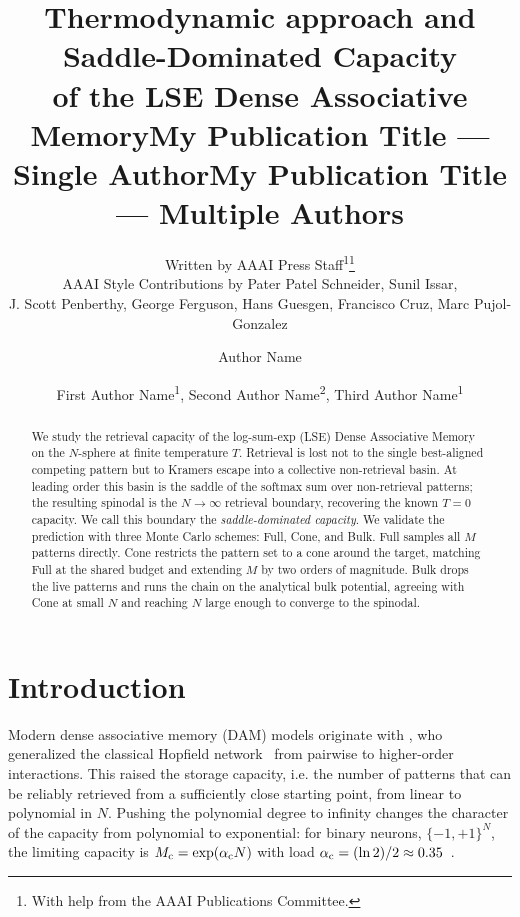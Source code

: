 \documentclass[letterpaper]{article} %
\title{\bfseries Thermodynamic approach and Saddle-Dominated Capacity
\\of the LSE Dense Associative Memory}
\author{
    Written by AAAI Press Staff\textsuperscript{\rm 1}\thanks{With help from the AAAI Publications Committee.}\\
    AAAI Style Contributions by Pater Patel Schneider,
    Sunil Issar,\\
    J. Scott Penberthy,
    George Ferguson,
    Hans Guesgen,
    Francisco Cruz\equalcontrib,
    Marc Pujol-Gonzalez\equalcontrib
}
\title{My Publication Title --- Single Author}
\author {
    Author Name
}
\title{My Publication Title --- Multiple Authors}
\author {
    First Author Name\textsuperscript{\rm 1},
    Second Author Name\textsuperscript{\rm 2},
    Third Author Name\textsuperscript{\rm 1}
}
\begin{document}
\maketitle

\begin{abstract}
We study the retrieval capacity of the log-sum-exp (LSE) Dense Associative Memory on the $N$-sphere at finite temperature $T$. Retrieval is lost not to the single best-aligned competing pattern but to Kramers escape into a collective non-retrieval basin. At leading order this basin is the saddle of the softmax sum over non-retrieval patterns; the resulting spinodal is the $N \to \infty$ retrieval boundary, recovering the known $T = 0$ capacity. We call this boundary the \textit{saddle-dominated capacity}. We validate the prediction with three Monte Carlo schemes: Full, Cone, and Bulk. Full samples all $M$ patterns directly. Cone restricts the pattern set to a cone around the target, matching Full at the shared budget and extending $M$ by two orders of magnitude. Bulk drops the live patterns and runs the chain on the analytical bulk potential, agreeing with Cone at small $N$ and reaching $N$ large enough to converge to the spinodal. %
\end{abstract}






\section{Introduction}

Modern dense associative memory (DAM) models originate with \citet{krotov2016dense}, who generalized the classical Hopfield network~\citep{Hopfield1982} from pairwise to higher-order interactions. This raised the storage capacity, i.e. the number of patterns that can be reliably retrieved from a sufficiently close starting point, from linear to polynomial in $N$. Pushing the polynomial degree to infinity changes the character of the capacity from polynomial to exponential: for binary neurons, $\{-1,+1\}^{N}$, the limiting capacity is $M_{\rm c} = \exp(\alpha_{\rm c} N)$ with load $\alpha_{\rm c} = (\ln 2)/2 \approx 0.35$~\citep{demircigil2017model}.
\end{document}
